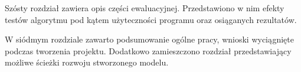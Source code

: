 Szósty rozdział zawiera opis części ewaluacyjnej. Przedstawiono w nim efekty testów algorytmu pod kątem użyteczności programu oraz osiąganych rezultatów.

W siódmym rozdziale zawarto podsumowanie ogólne pracy, wnioski wyciągnięte podczas tworzenia projektu. Dodatkowo zamieszczono rozdział przedstawiający możliwe ścieżki rozwoju stworzonego modelu.













